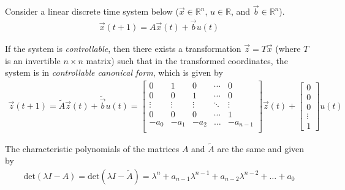 

Consider a linear discrete time system below ($\vec{x} \in
\mathbb{R}^n$, $u \in \mathbb{R}$, and $\vec{b} \in \mathbb{R}^n$).
\begin{align*}
\vec{x}(t+1) = A \vec{x}(t) + \vec{b} u(t)
\end{align*}

If the system is \textit{controllable},
then there exists a transformation $\vec{z} = T\vec{x}$ (where $T$ is an invertible $n\times n$ matrix)
such that in the transformed coordinates, the system is in
\textit{controllable canonical form}, which is given by
\begin{align*}
\vec{z}(t+1) = \widetilde{A}\vec{z}(t) + \widetilde{\vec{b}} u(t) = \begin{bmatrix}
0 & 1 & 0 & \cdots & 0 \\
0 & 0 & 1 & \cdots & 0 \\
\vdots & \vdots & \vdots  & \ddots & \vdots \\
 0 & 0 & 0 & \cdots & 1 \\
 -a_0 & -a_{1} & -a_{2} & \ldots & -a_{n-1} \\
\end{bmatrix} 
\vec{z}(t) +
\begin{bmatrix}
0 \\ 0 \\ 0 \\ \vdots \\ 1
\end{bmatrix}
u(t)
\end{align*}

The characteristic polynomials of the matrices $A$ and $\widetilde{A}$ are the same and given by
\begin{align}\label{eq:poly}
\mbox{det}(\lambda I - A ) = \mbox{det}(\lambda I - \widetilde{A} )
= \lambda^n  + a_{n-1} \lambda^{n-1} + a_{n-2} \lambda^{n-2} + \ldots + a_0
\end{align}

